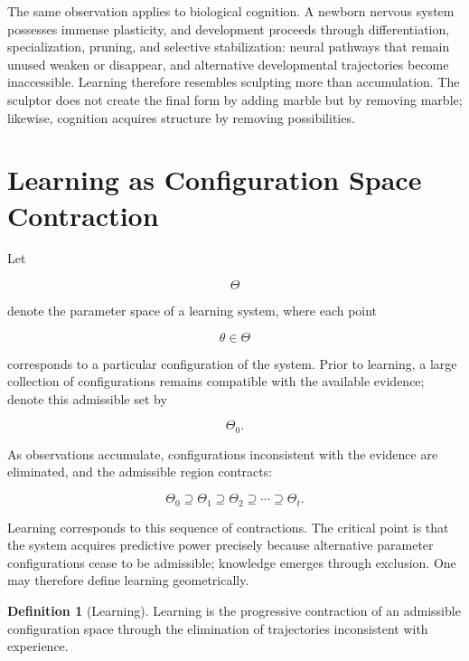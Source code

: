 \documentclass[11pt,oneside]{book}
\theoremstyle{plain}
\theoremstyle{definition}
\newtheorem{definition}[theorem]{Definition}
\theoremstyle{remark}
\begin{document}
The same observation applies to biological cognition. A newborn nervous system possesses immense plasticity, and development proceeds through differentiation, specialization, pruning, and selective stabilization: neural pathways that remain unused weaken or disappear, and alternative developmental trajectories become inaccessible. Learning therefore resembles sculpting more than accumulation. The sculptor does not create the final form by adding marble but by removing marble; likewise, cognition acquires structure by removing possibilities.

\section{Learning as Configuration Space Contraction}

Let

\begin{equation}
\Theta
\end{equation}

denote the parameter space of a learning system, where each point

\begin{equation}
\theta
\in
\Theta
\end{equation}

corresponds to a particular configuration of the system. Prior to learning, a large collection of configurations remains compatible with the available evidence; denote this admissible set by

\begin{equation}
\Theta_0.
\end{equation}

As observations accumulate, configurations inconsistent with the evidence are eliminated, and the admissible region contracts:

\begin{equation}
\Theta_0
\supseteq
\Theta_1
\supseteq
\Theta_2
\supseteq
\cdots
\supseteq
\Theta_t.
\end{equation}

Learning corresponds to this sequence of contractions. The critical point is that the system acquires predictive power precisely because alternative parameter configurations cease to be admissible; knowledge emerges through exclusion. One may therefore define learning geometrically.

\begin{definition}[Learning]
Learning is the progressive contraction of an admissible configuration space through the elimination of trajectories inconsistent with experience.
\end{definition}
\end{document}
